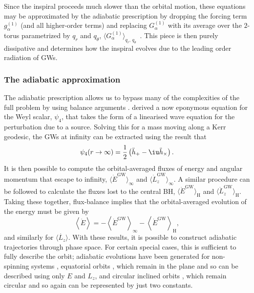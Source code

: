 Since the inspiral proceeds much slower than the orbital motion, these equations may be approximated by the adiabatic prescription by dropping the forcing term $g_\alpha^{(1)}$ (and all higher-order terms) and replacing $G_\alpha^{(1)}$ with its average over the $2$-torus parametrized by $q_r$ and $q_\theta$, $\langle G_\alpha^{(1)}\rangle_{q_r,\,q_\theta}$~\citep{drasco_computing_2005}. This piece is then purely dissipative and determines how the inspiral evolves due to the leading order radiation of GWs.

\subsubsection{The adiabatic approximation}

The adiabatic prescription allows us to bypass many of the complexities of the full problem by using balance arguments \citep{hughes_gravitational_2005}.  derived a now eponymous equation for the Weyl scalar, $\psi_4$, that takes the form of a linearised wave equation for the perturbation due to a source. Solving this for a mass moving along a Kerr geodesic, the GWs at infinity can be extracted using the result that
\begin{equation}
\label{eq:teukolsky-waveform}
\psi_4 (r\rightarrow\infty) = \frac1{2}\left(\ddot{h}_+ - \iu \ddot{h}_\times\right).
\end{equation}
It is then possible to compute the orbital-averaged fluxes of energy and angular momentum that escape to infinity, $\langle\dot{E}^\mathrm{GW}\rangle_{\infty}$ and $\langle\dot{L}_z^\mathrm{GW}\rangle_{\infty}$. A similar procedure can be followed to calculate the fluxes lost to the central BH, $\langle\dot{E}^\mathrm{GW}\rangle_{\mathrm{H}}$ and $\langle\dot{L}_z^\mathrm{GW}\rangle_{\mathrm{H}}$. Taking these together, flux-balance implies that the orbital-averaged evolution of the energy must be given by
\begin{equation}
\left\langle\dot{E}\right\rangle = - \left\langle\dot{E}^\mathrm{GW}\right\rangle_{\infty} - \left\langle\dot{E}^\mathrm{GW}\right\rangle_{\mathrm{H}},
\end{equation}
and similarly for $\langle\dot{L_z}\rangle$. With these results, it is possible to construct adiabatic trajectories through phase space. For certain special cases, this is sufficient to fully describe the orbit; adiabatic evolutions have been generated for non-spinning systems \citep{cutler_gravitational_1994}, equatorial orbits \citep{glampedakis_zoom_2002}, which remain in the plane and so can be described using only $E$ and $L_z$, and circular inclined orbits \citep{hughes_evolution_2000}, which remain circular \citep{ryan_effect_1996} and so again can be represented by just two constants.

